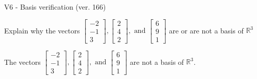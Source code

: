 \begin{exercise}
  \begin{exerciseTitle}V6 - Basis verification (ver. 166)\end{exerciseTitle}
  \begin{exerciseStatement}
    Explain why the vectors \(\left[\begin{array}{r}
-2 \\
-1 \\
3
\end{array}\right] , \left[\begin{array}{r}
2 \\
4 \\
2
\end{array}\right] , \text{ and } \left[\begin{array}{r}
6 \\
9 \\
1
\end{array}\right]\) are or are not a basis of \(\mathbb{R}^3\)	


  \end{exerciseStatement}
  \begin{exerciseAnswer}
   The vectors \(\left[\begin{array}{r}
-2 \\
-1 \\
3
\end{array}\right] , \left[\begin{array}{r}
2 \\
4 \\
2
\end{array}\right] , \text{ and } \left[\begin{array}{r}
6 \\
9 \\
1
\end{array}\right]\) 
  	 are not  a basis of \(\mathbb{R}^3\).
  


  \end{exerciseAnswer}
\end{exercise}